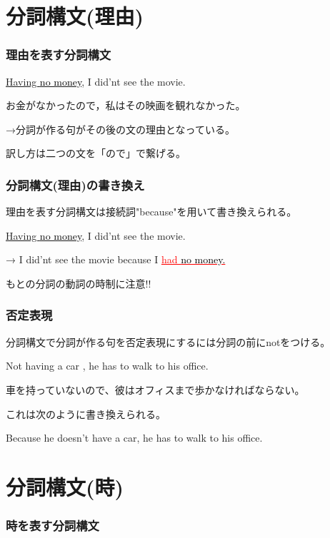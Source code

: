 \documentclass[xcolor=dvipsnames,unicode,14pt]{beamer}%
\begin{document}
\section{分詞構文(理由)}
\begin{frame}
  \frametitle{理由を表す分詞構文}

  \textcolor{NavyBlue}{\underline{Having \textcolor{black}{no money}}}, I did'nt see the movie.

  お金がなかったので，私はその映画を観れなかった。

  →分詞が作る句がその後の文の理由となっている。

  訳し方は二つの文を「ので」で繋げる。
\end{frame}

\begin{frame}
  \frametitle{分詞構文(理由)の書き換え}

  理由を表す分詞構文は接続詞"because"を用いて書き換えられる。

  \textcolor{NavyBlue}{\underline{Having \textcolor{black}{no money}}}, I did'nt see the movie.

  → I did'nt see the movie \textcolor{NavyBlue}{because}
   I \textcolor{Red}{\underline{had \textcolor{black}{no money.}}}

  もとの分詞の動詞の時制に注意!!

\end{frame}
\begin{frame}
  \frametitle{否定表現}

  分詞構文で分詞が作る句を否定表現にするには分詞の前にnotをつける。

  \textcolor{NavyBlue}{Not having a car} , he has to walk to his office.

  車を持っていないので、彼はオフィスまで歩かなければならない。

  これは次のように書き換えられる。

  \textcolor{NavyBlue}{Because he doesn't have a car}, he has to walk to his office.

\end{frame}

\section{分詞構文(時)}
\begin{frame}
  \frametitle{時を表す分詞構文}

  

\end{frame}
\end{document}
